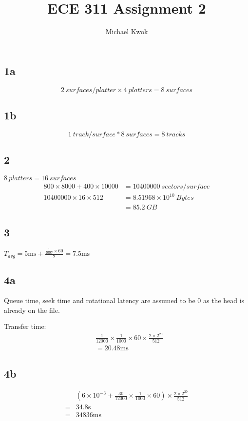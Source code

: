 \documentclass{article}
\title{ECE 311 Assignment 2}
\author{Michael Kwok}
\begin{document}
\maketitle
\begin{multicols}{2}
    \subsection*{1a}
    \[
        2~surfaces/platter \times 4~platters = 8~surfaces
    \]
    \subsection*{1b}
    \[
        1~track/surface * 8~surfaces = 8~tracks
    \]
    \subsection*{2}
    \( 8~platters = 16~surfaces\)
    \begin{align*}
        800 \times 8000 + 400 \times 10000 & = 10400000~sectors/surface    \\
        10400000 \times 16 \times 512      & = 8.51968\times 10^{10}~Bytes \\
                                           & = 85.2~GB
    \end{align*}
    \subsection*{3}
    \(T_{avg} = 5\si{\milli\second} + \frac{\frac{1}{2000}\times 60}{2} = 7.5 \si{\milli\second}\)
    \subsection*{4a}
    Queue time, seek time and rotational latency are assumed to be 0 as the head is already on the file.

    Transfer time:
    \begin{align*}
         & \frac{1}{12000} \times \frac{1}{1000}\times 60 \times \frac{2\times 2^{20}}{512} \\
         & = 20.48\si{\milli\second}
    \end{align*}
    \subsection*{4b}
    \begin{align*}
          & \left( 6\times 10^{-3} + \frac{30}{12000}\times\frac{1}{1000}\times 60 \right) \times \frac{2\times 2^{20}}{512} \\
        = & 34.8\si{\second}                                                                                                 \\
        = & 34836 \si{\milli\second}
    \end{align*}

\end{multicols}
\end{document}
